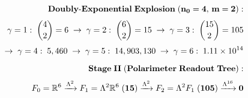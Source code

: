 \documentclass[preview]{standalone}
\begin{document}
\begin{align*}
\special{dvisvgm:raw <g id='unique000'>}\mathbf{Doubly\text{-}Exponential\;Explosion\;(n_0=4,\, m=2):}\\[3pt]\gamma=1:\;\binom{4}{2}=6 \;\to\; \gamma=2:\;\binom{6}{2}=15 \;\to\; \gamma=3:\;\binom{15}{2}=105\\[3pt]\to\; \gamma=4:\; 5,460 \;\to\; \gamma=5:\; 14,903,130 \;\to\; \gamma=6:\; 1.11\times 10^{14}\\[6pt]\mathbf{Stage\;II\;(Polarimeter\;Readout\;Tree):}\\[3pt]F_0=\mathbb{R}^6 \xrightarrow{\Lambda^2} F_1=\Lambda^2\mathbb{R}^6\;(\mathbf{15}) \xrightarrow{\Lambda^2} F_2=\Lambda^2 F_1\;(\mathbf{105}) \xrightarrow{\Lambda^{16}} \mathbf{0}\special{dvisvgm:raw </g>}
\end{align*}
\end{document}
